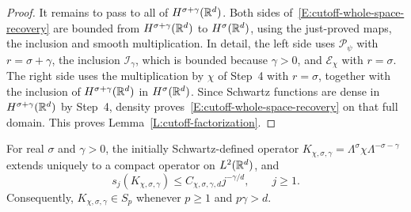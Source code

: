 \begin{proof}
  It remains to pass to all of $H^{\sigma+\gamma}(\mathbb{R}^d)$. Both sides
  of~\eqref{E:cutoff-whole-space-recovery} are bounded from
  $H^{\sigma+\gamma}(\mathbb{R}^d)$ to $H^\sigma(\mathbb{R}^d)$, using the just-proved maps,
  the inclusion and smooth multiplication. In detail, the left side uses
  $\mathcal{P}_\psi$ with $r = \sigma+\gamma$, the inclusion
  $\mathcal{I}_\gamma$, which is bounded because $\gamma > 0$, and
  $\mathcal{E}_\chi$ with $r = \sigma$. The right side uses the multiplication
  by $\chi$ of Step~4 with $r = \sigma$, together with the inclusion of
  $H^{\sigma+\gamma}(\mathbb{R}^d)$ in $H^\sigma(\mathbb{R}^d)$. Since Schwartz functions are
  dense in $H^{\sigma+\gamma}(\mathbb{R}^d)$ by Step~4, density
  proves~\eqref{E:cutoff-whole-space-recovery} on that full domain. This
  proves Lemma~\ref{L:cutoff-factorization}.
\end{proof}

\begin{proposition}\label{P:cutoff-singular-values}
  For real $\sigma$ and $\gamma > 0$, the initially Schwartz-defined operator
  $K_{\chi,\sigma,\gamma} = \Lambda^\sigma\chi\Lambda^{-\sigma-\gamma}$ extends
  uniquely to a compact operator on $L^2(\mathbb{R}^d)$, and
  \begin{equation}\label{E:cutoff-singular-values}
    s_j(K_{\chi,\sigma,\gamma})
    \le C_{\chi,\sigma,\gamma,d}j^{-\gamma/d},\qquad j \ge 1.
  \end{equation}
  Consequently, $K_{\chi,\sigma,\gamma} \in S_p$ whenever $p \ge 1$ and $p\gamma
  > d$.
\end{proposition}

